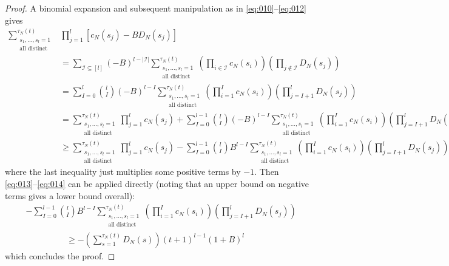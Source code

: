 \begin{proof}
A binomial expansion and subsequent manipulation as in \eqref{eq:010}--\eqref{eq:012} gives
\begin{align*}
\sum_{\substack{ s_1, \dots, s_l =1 \\ \text{all distinct} }}^{\tau_N(t)} 
        &\prod_{j=1}^l 
        \left[ c_N(s_j) - B D_N(s_j) \right] \\
&= \sum_{\mathcal{I} \subseteq [l]} (-B)^{l-|\mathcal{I}|}
        \sum_{\substack{ s_1, \dots, s_l =1 \\ \text{all distinct} }}^{\tau_N(t)}
        \left( \prod_{i\in\mathcal{I}} c_N(s_i) \right)
        \left( \prod_{j\notin\mathcal{I}} D_N(s_j) \right) \\
&= \sum_{I=0}^l \binom{l}{I} (-B)^{l-I} 
        \sum_{\substack{ s_1, \dots, s_l =1 \\ \text{all distinct} }}^{\tau_N(t)}
        \left( \prod_{i=1}^I c_N(s_i) \right)
        \left( \prod_{j=I+1}^l D_N(s_j) \right) \\
&= \sum_{\substack{ s_1, \dots, s_l =1 \\ \text{all distinct} }}^{\tau_N(t)} 
        \prod_{j=1}^l c_N(s_j)
        + \sum_{I=0}^{l-1} \binom{l}{I} (-B)^{l-I} 
        \sum_{\substack{ s_1, \dots, s_l =1 \\ \text{all distinct} }}^{\tau_N(t)}
        \left( \prod_{i=1}^I c_N(s_i) \right) 
        \left( \prod_{j=I+1}^l D_N(s_j) \right) \\
&\geq \sum_{\substack{ s_1, \dots, s_l =1 \\ \text{all distinct} }}^{\tau_N(t)} 
        \prod_{j=1}^l c_N(s_j)
        - \sum_{I=0}^{l-1} \binom{l}{I} B^{l-I} 
        \sum_{\substack{ s_1, \dots, s_l =1 \\ \text{all distinct} }}^{\tau_N(t)}
        \left( \prod_{i=1}^I c_N(s_i) \right) \left( \prod_{j=I+1}^l D_N(s_j) \right)
\end{align*}
where the last inequality just multiplies some positive terms by $-1$.
Then \eqref{eq:013}--\eqref{eq:014} can be applied directly (noting that an upper bound on negative terms gives a lower bound overall):
\begin{align*}
&- \sum_{I=0}^{l-1} \binom{l}{I} B^{l-I} 
        \sum_{\substack{ s_1, \dots, s_l =1 \\ \text{all distinct} }}^{\tau_N(t)}
        \left( \prod_{i=1}^I c_N(s_i) \right) \left( \prod_{j=I+1}^l D_N(s_j) \right) \\
&\hspace{2cm}\geq - \left( \sum_{s=1}^{\tau_N(t)} D_N(s) \right) (t+1)^{l-1} (1+B)^l 
\end{align*}
which concludes the proof.
\end{proof}




